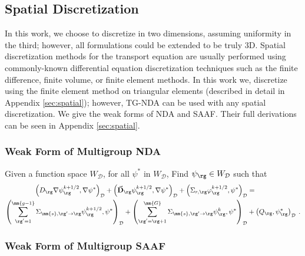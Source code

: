 \subsection{Spatial Discretization}
In this work, we choose to discretize in two dimensions, assuming uniformity in the third; however, all formulations could be extended to be truly 3D. Spatial discretization methods for the transport equation are usually performed using commonly-known differential equation discretization techniques such as the finite difference, finite volume, or finite element methods. In this work we, discretize using the finite element method on triangular elements (described in detail in Appendix \ref{sec:spatial}); however, TG-NDA can be used with any spatial discretization. We give the weak forms of NDA and SAAF. Their full derivations can be seen in Appendix \ref{sec:spatial}. 


\subsubsection{Weak Form of Multigroup NDA}

Given a function space $W_\mathcal{D}$, for all $\psi^*$ in $W_\mathcal{D}$, Find $\psi_{\rg} \in W_\mathcal{D}$ such that
%
\begin{equation}
 \begin{split}
  \left(D_\rg \nabla \psi_\rg^{k+1/2}, \nabla \psi^*\right)_\mathcal{D} + \left(\vec{\bf{D}}_\rg \psi_\rg^{k+1/2} , \nabla \psi^*\right)_\mathcal{D} +  \left(\Sigma_{r,\rg} \varphi_{\rg}^{k+1/2}, \psi^*\right)_\mathcal{D} &=  \\
   \left(\sum\limits_{\substack{\rg'=1}}^\mm{g-1} \Sigma_{\mm{s},\rg' \to\rg}\psi_{\rg}^{k+1/2}, \psi^*\right)_\mathcal{D} + \left(\sum\limits_{\substack{\rg'=\rg+1}}^\mm{G} \Sigma_{\mm{s},\rg' \to\rg}\psi_{\rg}^{k}, \psi^*\right)_\mathcal{D} 
  &+ \left(Q_{\rg}, \psi^*_\rg\right)_\mathcal{D} \:.
 \end{split}
 \label{k1/2}
\end{equation}


\DIFdelbegin {}%

\DIFdelend \subsubsection{Weak Form of Multigroup SAAF}
\DIFdelbegin {}\DIFdelend 

